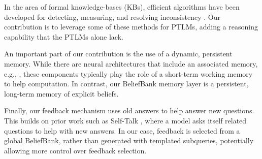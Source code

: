 \documentclass[11pt]{article}
\newcommand{\eat}[1]{}
\newcommand{\red}[1]{\textcolor{red}{#1}}
\begin{document}
In the area of formal knowledge-bases (KBs), efficient algorithms
have been developed for detecting, measuring, and resolving inconsistency
\cite{hansen2000probabilistic,andersen2001easy,Thimm:2009d,muino2011measuring,Thimm:2013}.
Our contribution is to leverage some of these methods for PTLMs,
adding a reasoning capability that the PTLMs alone lack.

An important part of our contribution is the use of a dynamic, persistent memory.
While there are neural architectures that include an associated memory,
e.g., \cite{Henaff2017TrackingTW,Sukhbaatar2015EndToEndMN}, these components
typically play the role of a short-term working memory to help computation.
In contrast, our BeliefBank memory layer is a persistent, long-term memory of
explicit beliefs.

Finally, our feedback mechanism uses old answers to help answer new questions.
This builds on prior work such as Self-Talk \cite{selftalk},
where a model asks itself related questions to help with new answers.
In our case, feedback is selected from a global BeliefBank, rather
than generated with templated subqueries, potentially allowing more 
control over feedback selection.

\eat{
Finally, our feedback mechanism uses earlier answers to help with new questions.
This is closely related to, and builds on, prior work where a model uses
its own answers to subquestions as 

Finally, our feedback mechanism builds on prior work where answers to

builds on prior work where a model
asks itself appropriate subquestions, and uses those answers to help
answer a main question 
}

\eat{
\subsection{Faithfulness}
\citet{subramanian-etal-2020-obtaining}
introduce the concept of module-wise faithfulness, a systematic evaluation of faithfulness in neural module networks for reasoning. We show that naive training does not produce faithful modules and propose several techniques to improve module-wise faithfulness. 
}
\eat{
\subsection{Inconsistencies in KGs}
(copied from old paper, need rewrite)
Consistency in KBs has been
studied in theoretical frameworks in the context of the
satisfiability problem and KB construction, and efficient
algorithms for detecting inconsistencies in KBs have been
proposed \cite{hansen2000probabilistic,andersen2001easy}.
Other work aims to quantify the degree to which KBs are
inconsistent and detects inconsistent statements
\cite{Thimm:2009d,muino2011measuring,Thimm:2013}.
}
\end{document}

